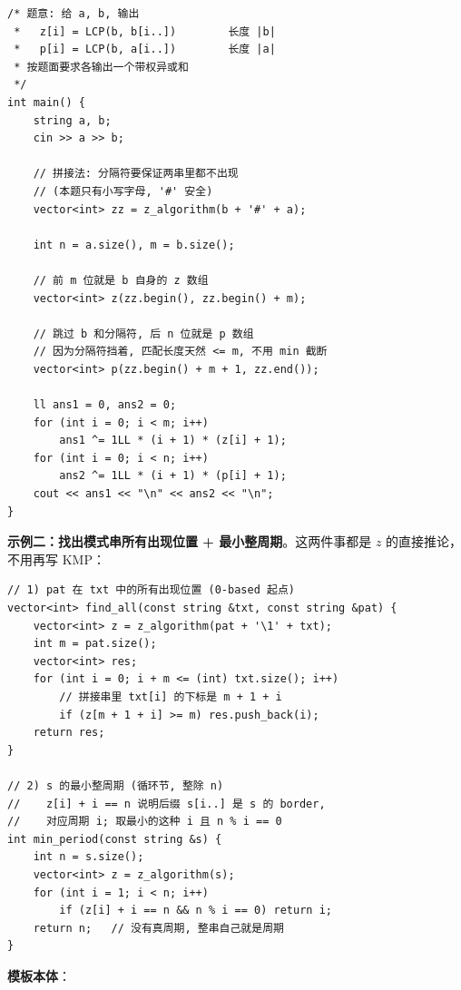 		\begin{verbatim}
/* 题意: 给 a, b, 输出
 *   z[i] = LCP(b, b[i..])        长度 |b|
 *   p[i] = LCP(b, a[i..])        长度 |a|
 * 按题面要求各输出一个带权异或和
 */
int main() {
    string a, b;
    cin >> a >> b;

    // 拼接法: 分隔符要保证两串里都不出现
    // (本题只有小写字母, '#' 安全)
    vector<int> zz = z_algorithm(b + '#' + a);

    int n = a.size(), m = b.size();

    // 前 m 位就是 b 自身的 z 数组
    vector<int> z(zz.begin(), zz.begin() + m);

    // 跳过 b 和分隔符, 后 n 位就是 p 数组
    // 因为分隔符挡着, 匹配长度天然 <= m, 不用 min 截断
    vector<int> p(zz.begin() + m + 1, zz.end());

    ll ans1 = 0, ans2 = 0;
    for (int i = 0; i < m; i++)
        ans1 ^= 1LL * (i + 1) * (z[i] + 1);
    for (int i = 0; i < n; i++)
        ans2 ^= 1LL * (i + 1) * (p[i] + 1);
    cout << ans1 << "\n" << ans2 << "\n";
}
		\end{verbatim}

		\textbf{示例二：找出模式串所有出现位置 + 最小整周期}。这两件事都是 $z$ 的直接推论，不用再写 KMP：

		\begin{verbatim}
// 1) pat 在 txt 中的所有出现位置 (0-based 起点)
vector<int> find_all(const string &txt, const string &pat) {
    vector<int> z = z_algorithm(pat + '\1' + txt);
    int m = pat.size();
    vector<int> res;
    for (int i = 0; i + m <= (int) txt.size(); i++)
        // 拼接串里 txt[i] 的下标是 m + 1 + i
        if (z[m + 1 + i] >= m) res.push_back(i);
    return res;
}

// 2) s 的最小整周期 (循环节, 整除 n)
//    z[i] + i == n 说明后缀 s[i..] 是 s 的 border,
//    对应周期 i; 取最小的这种 i 且 n % i == 0
int min_period(const string &s) {
    int n = s.size();
    vector<int> z = z_algorithm(s);
    for (int i = 1; i < n; i++)
        if (z[i] + i == n && n % i == 0) return i;
    return n;   // 没有真周期, 整串自己就是周期
}
		\end{verbatim}

		\textbf{模板本体}：

